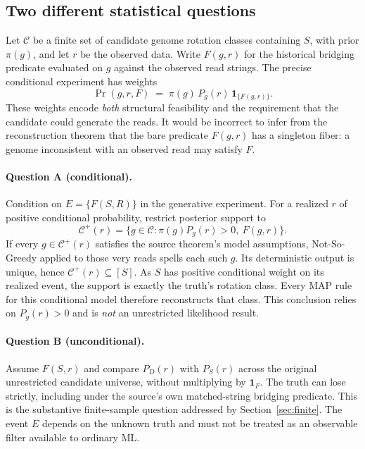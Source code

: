 \subsection{Two different statistical questions}
\label{sec:two-questions}

Let $\mathcal C$ be a finite set of candidate genome rotation classes containing
$S$, with prior $\pi(g)$, and let $r$ be the observed data.
Write $F(g,r)$ for the historical bridging predicate evaluated on $g$ against
the observed read strings. The precise conditional experiment has weights
\[
  \Pr(g,r,F) \;=\;
  \pi(g)\,P_g(r)\,\mathbf 1_{\{F(g,r)\}}.
\]
These weights encode \emph{both} structural feasibility and the requirement
that the candidate could generate the reads. It would be incorrect to infer
from the reconstruction theorem that the bare predicate $F(g,r)$ has a
singleton fiber: a genome inconsistent with an observed read may satisfy $F$.

\paragraph{Question A (conditional).}
Condition on $E=\{F(S,R)\}$ in the generative experiment. For a realized
$r$ of positive conditional probability, restrict posterior support to
\[
 \mathcal C^+(r)
 =\{g\in\mathcal C:\pi(g)P_g(r)>0,\ F(g,r)\}.
\]
If every $g\in\mathcal C^+(r)$ satisfies the source theorem's model
assumptions, Not-So-Greedy applied to those very reads spells each such $g$.
Its deterministic output is unique, hence $\mathcal C^+(r)\subseteq[S]$.
As $S$ has positive conditional weight on its realized event, the support is
exactly the truth's rotation class. Every MAP rule for this conditional model
therefore reconstructs that class. This conclusion relies on
$P_g(r)>0$ and is \emph{not} an unrestricted likelihood result.

\paragraph{Question B (unconditional).}
Assume $F(S,r)$ and compare $P_D(r)$ with $P_S(r)$ across the original
unrestricted candidate universe, without multiplying by $\mathbf 1_F$.
The truth can lose strictly, including under the source's own matched-string
bridging predicate. This is the substantive finite-sample question addressed
by Section~\ref{sec:finite}. The event $E$ depends on the unknown truth and
must not be treated as an observable filter available to ordinary ML.

